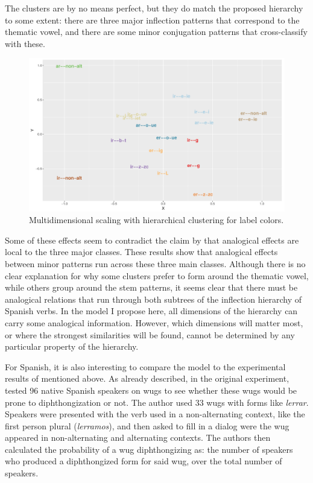 \largerpage 
The clusters are by no means perfect, but they do match the proposed hierarchy to some extent: there are three major inflection patterns that correspond to the thematic vowel, and there are some minor conjugation patterns that cross-classify with these.

\begin{figure}
  \centering
  \includegraphics[scale=0.68, angle=90]{./figures/spanish/spanish-verbs-clust-sim1.pdf}
  \caption{Multidimensional scaling with hierarchical clustering for label colors.}\label{fig:sp-fanny-infl}
\end{figure}

Some of these effects seem to contradict the claim by \textcite{Albright.2009} that analogical effects are local to the three major classes. These results show that analogical effects between minor patterns run across these three main classes. Although there is no clear explanation for why some clusters prefer to form around the thematic vowel, while others group around the stem patterns, it seems clear that there must be analogical relations that run through both subtrees of the inflection hierarchy of Spanish verbs. In the model I propose here, all dimensions of the hierarchy can carry some analogical information. However, which dimensions will matter most, or where  the strongest similarities will be found, cannot be determined by any particular property of the hierarchy.

For Spanish, it is also interesting to compare the model to the experimental results of \textcite{Albright.2009} mentioned above. As already described, in the original experiment, \textcite{Albright.2001} tested 96 native Spanish speakers on wugs to see whether these wugs would be prone to diphthongization or not. The author used 33 wugs with forms like \textit{lerrar}. Speakers were presented with the verb used in a non-alternating context, like the first person plural (\textit{lerramos}), and then asked to fill in a dialog were the wug appeared in non-alternating and alternating contexts. The authors then calculated the probability of a wug diphthongizing as: the number of speakers who produced a diphthongized form for said wug, over the total number of speakers.

